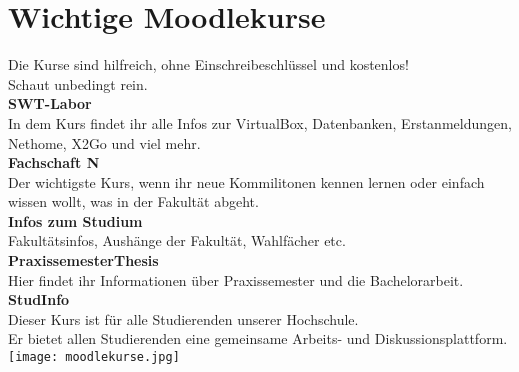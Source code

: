 \chapter{Wichtige Moodlekurse}

Die Kurse sind hilfreich, ohne Einschreibeschlüssel und kostenlos!\\
Schaut unbedingt rein.\\

\textbf{SWT-Labor}\\
In dem Kurs findet ihr alle Infos zur VirtualBox, Datenbanken, Erstanmeldungen, Nethome, X2Go und viel mehr.\\

\textbf{Fachschaft N}\\
Der wichtigste Kurs, wenn ihr neue Kommilitonen kennen lernen oder einfach wissen wollt, was in der Fakultät abgeht.\\

\textbf{Infos zum Studium}\\
Fakultätsinfos, Aushänge der Fakultät, Wahlfächer etc.\\ %

\textbf{PraxissemesterThesis}\\
Hier findet ihr Informationen über Praxissemester und die Bachelorarbeit.\\

\textbf{StudInfo}\\
Dieser Kurs ist für alle Studierenden unserer Hochschule.\\
Er bietet allen Studierenden eine gemeinsame Arbeits- und Diskussionsplattform.\\


\texttt{[image: moodlekurse.jpg]}